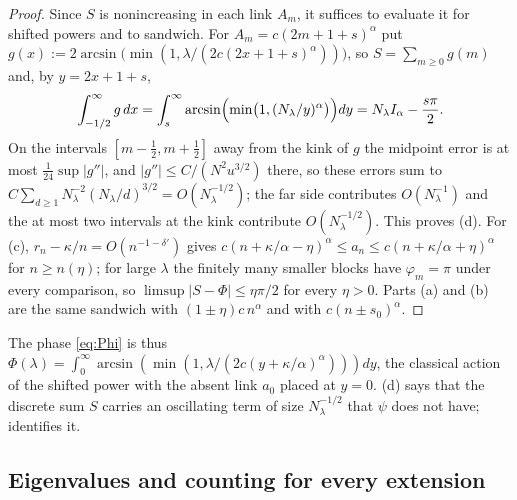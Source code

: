 \begin{proof}
Since $S$ is nonincreasing in each link $A_m$, it suffices to evaluate it for
shifted powers and to sandwich. For $A_m=c(2m+1+s)^\alpha$ put
$g(x):=2\arcsin\bigl(\min(1,\lambda/(2c(2x+1+s)^\alpha))\bigr)$, so $S=\sum_{m\ge0}g(m)$ and,
by $y=2x+1+s$,
\[
  \int_{-1/2}^\infty g\,dx=\int_s^\infty\arcsin\Bigl(\min\bigl(1,(N_\lambda/y)^\alpha\bigr)\Bigr)dy
  =N_\lambda I_\alpha-\frac{s\pi}2 .
\]
On the intervals $[m-\frac12,m+\frac12]$ away from the kink of $g$ the midpoint error is at
most $\frac1{24}\sup|g''|$, and $|g''|\le C/(N^2u^{3/2})$ there, so these errors sum to
$C\sum_{d\ge1}N_\lambda^{-2}(N_\lambda/d)^{3/2}=O(N_\lambda^{-1/2})$; the far side contributes
$O(N_\lambda^{-1})$ and the at most two intervals at the kink contribute
$O(N_\lambda^{-1/2})$. This proves (d). For (c), $r_n-\kappa/n=O(n^{-1-\delta'})$ gives
$c(n+\kappa/\alpha-\eta)^\alpha\le a_n\le c(n+\kappa/\alpha+\eta)^\alpha$ for $n\ge n(\eta)$; for large
$\lambda$ the finitely many smaller blocks have $\varphi_m=\pi$ under every comparison, so
$\limsup|S-\Phi|\le\eta\pi/2$ for every $\eta>0$. Parts (a) and (b) are the same sandwich
with $(1\pm\eta)c\,n^\alpha$ and with $c(n\pm s_0)^\alpha$.
\end{proof}

The phase \eqref{eq:Phi} is thus $\Phi(\lambda)=\int_0^\infty\arcsin(\min(1,\lambda/(2c(y+\kappa/\alpha)^\alpha)))dy$,
the classical action of the shifted power with the absent link $a_0$ placed at $y=0$.
(d) says that the discrete sum $S$ carries an oscillating term of
size $N_\lambda^{-1/2}$ that $\psi$ does not have;  identifies it.

\subsection{Eigenvalues and counting for every extension}

